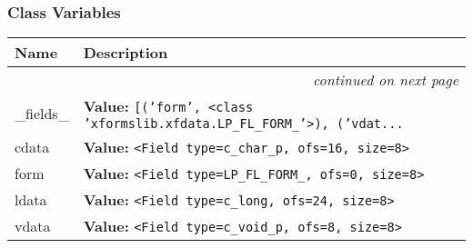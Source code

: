 
  \subsubsection{Class Variables}

    \vspace{-1cm}
\hspace{\varindent}\begin{longtable}{|p{\varnamewidth}|p{\vardescrwidth}|l}
\cline{1-2}
\cline{1-2} \centering \textbf{Name} & \centering \textbf{Description}& \\
\cline{1-2}
\endhead\cline{1-2}\multicolumn{3}{r}{\small\textit{continued on next page}}\\\endfoot\cline{1-2}
\endlastfoot\raggedright \_\-f\-i\-e\-l\-d\-s\-\_\- & \raggedright \textbf{Value:} 
{\tt \texttt{[}\texttt{(}\texttt{'}\texttt{form}\texttt{'}\texttt{, }{\textless}class 'xformslib.xfdata.LP\_FL\_FORM\_'{\textgreater}\texttt{)}\texttt{, }\texttt{(}\texttt{'}\texttt{vdat}\texttt{...}}&\\
\cline{1-2}
\raggedright c\-d\-a\-t\-a\- & \raggedright \textbf{Value:} 
{\tt {\textless}Field type=c\_char\_p, ofs=16, size=8{\textgreater}}&\\
\cline{1-2}
\raggedright f\-o\-r\-m\- & \raggedright \textbf{Value:} 
{\tt {\textless}Field type=LP\_FL\_FORM\_, ofs=0, size=8{\textgreater}}&\\
\cline{1-2}
\raggedright l\-d\-a\-t\-a\- & \raggedright \textbf{Value:} 
{\tt {\textless}Field type=c\_long, ofs=24, size=8{\textgreater}}&\\
\cline{1-2}
\raggedright v\-d\-a\-t\-a\- & \raggedright \textbf{Value:} 
{\tt {\textless}Field type=c\_void\_p, ofs=8, size=8{\textgreater}}&\\
\cline{1-2}
\end{longtable}




